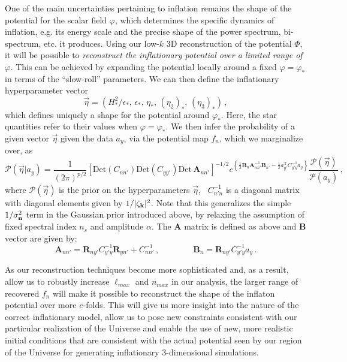 \documentclass[psfig,12pt]{article}
\def\be{\begin{equation}}
\def\ee{\end{equation}}
\begin{document}
{One of the main uncertainties pertaining to inflation remains the shape
of the potential for the scalar field $\varphi$, which determines the
specific dynamics of inflation, e.g. its energy scale and the precise
shape of the power spectrum, bi-spectrum, etc. it produces. Using our
low-$k$ 3D reconstruction of the potential $\Phi$, it will  be
possible to {\it reconstruct the inflationary potential over a limited range
of $\varphi$.} This can be achieved by expanding the potential locally around
a fixed $\varphi=\varphi_*$ in
terms of the
``slow-roll'' parameters. We can then define the inflationary
hyperparameter vector
\be
	\vec{\eta}=(H^2_*/\epsilon_*,\, \epsilon_*, \,\eta_*, \, (\eta_2)_*, \,(\eta_3)_*)\, ,
\ee
which defines uniquely a shape for the potential around $\varphi_*$.
Here, the star quantities refer to their values when
$\varphi=\varphi_*$.
We then infer the probability
of a given vector $\vec{\eta}$ given the data $a_y$, via the potential
map $f_n$, which we marginalize over,
as
\be
\mathcal{P}(\vec{\eta}| a_{y})=\frac{1}{(2\pi)^{p/2}} \left[\mathrm{Det}(C_{nn'})\mathrm{Det}(C_{yy'})\mathrm{Det}\,\mathbf{A}_{nn'}\right]^{-1/2}e^{\left\{\frac{1}{2}\mathbf{B}_{n}\mathbf{A}_{nn'}^{-1}\mathbf{B}_{n'}-\frac{1}{2}a^{\mathrm{T}}_{y'}C_{y'y}^{-1}a_{y} \right\}}\frac{\mathcal{P}(\vec{\eta})}{\mathcal{P}(a_{y})}\, ,
\ee
where $\mathcal{P}(\vec{\eta})$ is the prior on the
hyperparameters $\vec{\eta}$,
~$C_{n'n}^{-1}$ is a diagonal matrix with diagonal elements given by
$1/|\zeta_{{\bf k}}|^2$.
Note that this generalizes the simple $1/{\sigma_{\bf n}^2}$ term
in the
Gaussian prior introduced above, by relaxing
the assumption of fixed spectral
index $n_s$ and amplitude $\alpha$.
The $\mathbf{A}$ matrix is defined as above and $\mathbf{B}$ vector are given by:
\be
	\mathbf{A}_{nn'} = \mathbf{R}_{ny'}C^{-1}_{y'y} \mathbf{R}_{yn'}+C_{nn'}^{-1}\, ,\qquad \qquad
	 \mathbf{B}_{n}  = \mathbf{R}_{ny'} C_{y'y}^{-1}  a_{y}\, .
\ee

As our reconstruction techniques become more sophisticated and, as a result, allow us to robustly increase $\ell_{max}$ and $n_{max}$ in our analysis, the larger range of recovered $f_n$ will make it possible to reconstruct the shape of the inflaton potential over more $e$-folds. This will give us more insight into the nature of the correct inflationary model, allow us to pose new constraints consistent with our particular realization of the Universe and enable the use of new, more realistic initial conditions that are consistent with the actual potential seen by our region of the Universe for generating inflationary 3-dimensional simulations.


}
\end{document}
